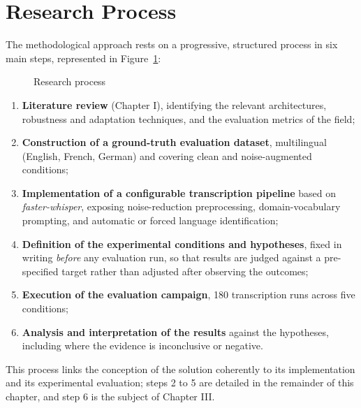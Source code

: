 \documentclass[12pt]{report}
\begin{document}
\section{Research Process}
The methodological approach rests on a progressive, structured process in six main steps, represented in Figure~\ref{fig:process}:
\begin{figure}[H]
\centering
{}
\caption{Research process}
\label{fig:process}
\end{figure}
\begin{enumerate}
    \item \textbf{Literature review} (Chapter I), identifying the relevant architectures, robustness and adaptation techniques, and the evaluation metrics of the field;
    \item \textbf{Construction of a ground-truth evaluation dataset}, multilingual (English, French, German) and covering clean and noise-augmented conditions;
    \item \textbf{Implementation of a configurable transcription pipeline} based on \textit{faster-whisper}, exposing noise-reduction preprocessing, domain-vocabulary prompting, and automatic or forced language identification;
    \item \textbf{Definition of the experimental conditions and hypotheses}, fixed in writing \emph{before} any evaluation run, so that results are judged against a pre-specified target rather than adjusted after observing the outcomes;
    \item \textbf{Execution of the evaluation campaign}, 180 transcription runs across five conditions;
    \item \textbf{Analysis and interpretation of the results} against the hypotheses, including where the evidence is inconclusive or negative.
\end{enumerate}
This process links the conception of the solution coherently to its implementation and its experimental evaluation; steps 2 to 5 are detailed in the remainder of this chapter, and step 6 is the subject of Chapter III.
\end{document}

